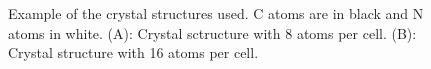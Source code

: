 \begin{figure}[p]
\center
\label{fig:structures}


\caption{Example of the crystal structures used. C atoms are in black and N atoms in white. (A): Crystal sctructure with 8 atoms per cell. (B): Crystal structure with 16 atoms per cell.}

\end{figure}
\newpage
